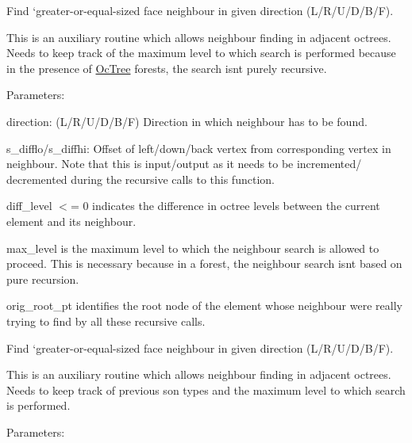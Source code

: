 Find `greater-\/or-\/equal-\/sized face neighbour\textquotesingle{} in given direction (L/\+R/\+U/\+D/\+B/F). 

This is an auxiliary routine which allows neighbour finding in adjacent octrees. Needs to keep track of the maximum level to which search is performed because in the presence of \hyperlink{classoomph_1_1OcTree}{Oc\+Tree} forests, the search isn\textquotesingle{}t purely recursive.

Parameters\+:
\begin{DoxyItemize}
\item direction\+: (L/\+R/\+U/\+D/\+B/F) Direction in which neighbour has to be found.
\item s\+\_\+difflo/s\+\_\+diffhi\+: Offset of left/down/back vertex from corresponding vertex in neighbour. Note that this is input/output as it needs to be incremented/ decremented during the recursive calls to this function.
\item diff\+\_\+level $<$= 0 indicates the difference in octree levels between the current element and its neighbour.
\item max\+\_\+level is the maximum level to which the neighbour search is allowed to proceed. This is necessary because in a forest, the neighbour search isn\textquotesingle{}t based on pure recursion.
\item orig\+\_\+root\+\_\+pt identifies the root node of the element whose neighbour we\textquotesingle{}re really trying to find by all these recursive calls.
\end{DoxyItemize}

Find `greater-\/or-\/equal-\/sized face neighbour\textquotesingle{} in given direction (L/\+R/\+U/\+D/\+B/F).

This is an auxiliary routine which allows neighbour finding in adjacent octrees. Needs to keep track of previous son types and the maximum level to which search is performed.

Parameters\+:


